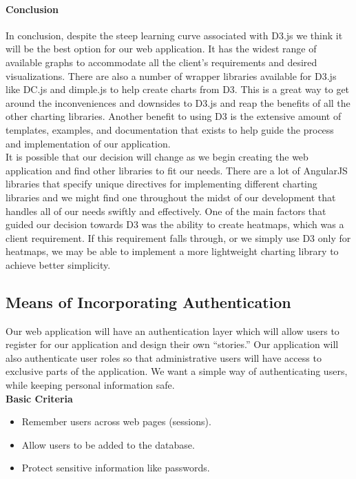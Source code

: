 \paragraph{Conclusion}
In conclusion, despite the steep learning curve associated with D3.js we think it will be the best option for our web application. It has the widest range of available graphs to accommodate all the client's requirements and desired visualizations. There are also a number of wrapper libraries available for D3.js like DC.js and dimple.js to help create charts from D3. This is a great way to get around the inconveniences and downsides to D3.js and reap the benefits of all the other charting libraries. Another benefit to using D3 is the extensive amount of templates, examples, and documentation that exists to help guide the process and implementation of our application.\\
It is possible that our decision will change as we begin creating the web application and find other libraries to fit our needs. There are a lot of AngularJS libraries that specify unique directives for implementing different charting libraries and we might find one throughout the midst of our development that handles all of our needs swiftly and effectively. One of the main factors that guided our decision towards D3 was the ability to create heatmaps, which was a client requirement. If this requirement falls through, or we simply use D3 only for heatmaps, we may be able to implement a more lightweight charting library to achieve better simplicity.
\subsection{Means of Incorporating Authentication}
Our web application will have an authentication layer which will allow users to register for our application and design their own ``stories.'' Our application will also authenticate user roles so that administrative users will have access to exclusive parts of the application. We want a simple way of authenticating users, while keeping personal information safe.\\
\textbf{Basic Criteria}
\begin{itemize}
\item Remember users across web pages (sessions). 
\item Allow users to be added to the database. 
\item Protect sensitive information like passwords.
\end{itemize}
